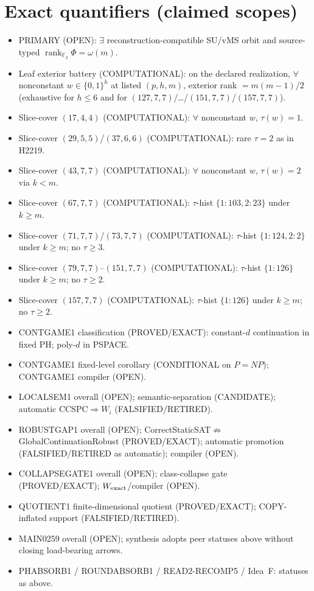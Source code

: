 \documentclass[11pt]{article}
\begin{document}
\section*{Exact quantifiers (claimed scopes)}
\begin{itemize}
\item PRIMARY (OPEN): $\exists$ reconstruction-compatible SU/vMS orbit and source-typed
  $\operatorname{rank}_{\mathbb F_2}\Phi=\omega(m)$.
\item Leaf exterior battery (COMPUTATIONAL): on the declared realization, $\forall$ nonconstant
  $w\in\{0,1\}^h$ at listed $(p,h,m)$, exterior rank $=m(m-1)/2$
  (exhaustive for $h\le6$ and for $(127,7,7)$/\ldots/$(151,7,7)$/$(157,7,7)$).
\item Slice-cover $(17,4,4)$ (COMPUTATIONAL): $\forall$ nonconstant $w$, $\tau(w)=1$.
\item Slice-cover $(29,5,5)$/$(37,6,6)$ (COMPUTATIONAL): rare $\tau{=}2$ as in H2219.
\item Slice-cover $(43,7,7)$ (COMPUTATIONAL): $\forall$ nonconstant $w$, $\tau(w)=2$ via $k{<}m$.
\item Slice-cover $(67,7,7)$ (COMPUTATIONAL): $\tau$-hist $\{1{:}103,2{:}23\}$ under $k{\ge}m$.
\item Slice-cover $(71,7,7)$/$(73,7,7)$ (COMPUTATIONAL): $\tau$-hist $\{1{:}124,2{:}2\}$ under $k{\ge}m$;
  no $\tau{\ge}3$.
\item Slice-cover $(79,7,7)$--$(151,7,7)$ (COMPUTATIONAL): $\tau$-hist $\{1{:}126\}$ under $k{\ge}m$;
  no $\tau{\ge}2$.
\item Slice-cover $(157,7,7)$ (COMPUTATIONAL): $\tau$-hist $\{1{:}126\}$ under $k{\ge}m$;
  no $\tau{\ge}2$.
\item CONTGAME1 classification (PROVED/EXACT): constant-$d$ continuation in fixed PH;
  poly-$d$ in PSPACE.
\item CONTGAME1 fixed-level corollary (CONDITIONAL on $P=NP$); CONTGAME1 compiler (OPEN).
\item LOCALSEM1 overall (OPEN); semantic-separation (CANDIDATE); automatic CCSPC$\Rightarrow W_i$ (FALSIFIED/RETIRED).
\item ROBUSTGAP1 overall (OPEN); CorrectStaticSAT$\not\Rightarrow$GlobalContinuationRobust (PROVED/EXACT);
  automatic promotion (FALSIFIED/RETIRED as automatic); compiler (OPEN).
\item COLLAPSEGATE1 overall (OPEN); class-collapse gate (PROVED/EXACT); $W_{\rm exact}$/compiler (OPEN).
\item QUOTIENT1 finite-dimensional quotient (PROVED/EXACT); COPY-inflated support (FALSIFIED/RETIRED).
\item MAIN0259 overall (OPEN); synthesis adopts peer statuses above without closing load-bearing arrows.
\item PHABSORB1 / ROUNDABSORB1 / READ2-RECOMP5 / Idea~F: statuses as above.
\end{itemize}
\end{document}
